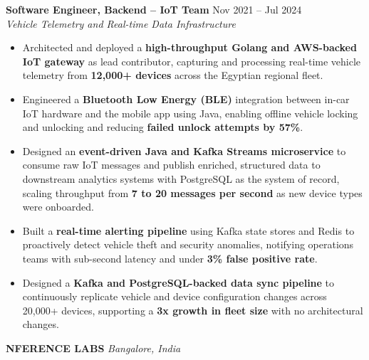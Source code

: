 \documentclass[11pt,a4paper]{article}
\begin{document}
\vspace{4pt}
\noindent\textbf{Software Engineer, Backend -- IoT Team} \hfill Nov 2021 -- Jul 2024 \\
\textit{Vehicle Telemetry and Real-time Data Infrastructure}\vspace{3pt}
\begin{itemize}[leftmargin=*, noitemsep, topsep=1pt, label={\small\textbullet}, itemsep=0pt]
\RaggedRight
    \item Architected and deployed a \textbf{high-throughput Golang and AWS-backed IoT gateway} as lead contributor, capturing and processing real-time vehicle telemetry from \textbf{12,000+ devices} across the Egyptian regional fleet.
    \item Engineered a \textbf{Bluetooth Low Energy (BLE)} integration between in-car IoT hardware and the mobile app using Java, enabling offline vehicle locking and unlocking and reducing \textbf{failed unlock attempts by 57\%}.
    \item Designed an \textbf{event-driven Java and Kafka Streams microservice} to consume raw IoT messages and publish enriched, structured data to downstream analytics systems with PostgreSQL as the system of record, scaling throughput from \textbf{7 to 20 messages per second} as new device types were onboarded.
    \item Built a \textbf{real-time alerting pipeline} using Kafka state stores and Redis to proactively detect vehicle theft and security anomalies, notifying operations teams with sub-second latency and under \textbf{3\% false positive rate}.
    \item Designed a \textbf{Kafka and PostgreSQL-backed data sync pipeline} to continuously replicate vehicle and device configuration changes across 20,000+ devices, supporting a \textbf{3x growth in fleet size} with no architectural changes.
\end{itemize}

\vspace{4pt}

{\Large\bfseries NFERENCE LABS} \hfill \textit{Bangalore, India}
\end{document}

